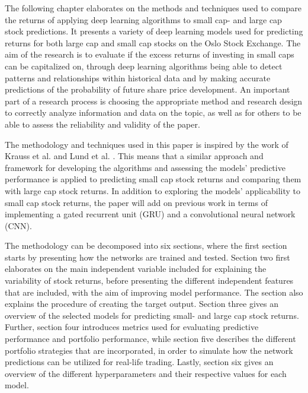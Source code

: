 The following chapter elaborates on the methods and techniques used to compare the returns of applying deep learning algorithms to small cap- and large cap stock predictions. It presents a variety of deep learning models used for predicting returns for both large cap and small cap stocks on the Oslo Stock Exchange. The aim of the research is to evaluate if the excess returns of investing in small caps can be capitalized on, through deep learning algorithms being able to detect patterns and relationships within historical data and by making accurate predictions of the probability of future share price development. An important part of a research process is choosing the appropriate method and research design to correctly analyze information and data on the topic, as well as for others to be able to assess the reliability and validity of the paper. 

\indent\newline
The methodology and techniques used in this paper is inspired by the work of Krauss et al. and Lund et al. \cite{krauss} \cite{lund}. This means that a similar approach and framework for developing the algorithms and assessing the models' predictive performance is applied to predicting small cap stock returns and comparing them with large cap stock returns. In addition to exploring the models' applicability to small cap stock returns, the paper will add on previous work in terms of implementing a gated recurrent unit (GRU) and a convolutional neural network (CNN).   

\indent\newline
The methodology can be decomposed into six sections, where the first section starts by presenting how the networks are trained and tested. Section two first elaborates on the main independent variable included for explaining the variability of stock returns, before presenting the different independent features that are included, with the aim of improving model performance. The section also explains the procedure of creating the target output. Section three gives an overview of the selected models for predicting small- and large cap stock returns. Further, section four introduces metrics used for evaluating predictive performance and portfolio performance, while section five describes the different portfolio strategies that are incorporated, in order to simulate how the network predictions can be utilized for real-life trading. Lastly, section six gives an overview of the different hyperparameters and their respective values for each model.

